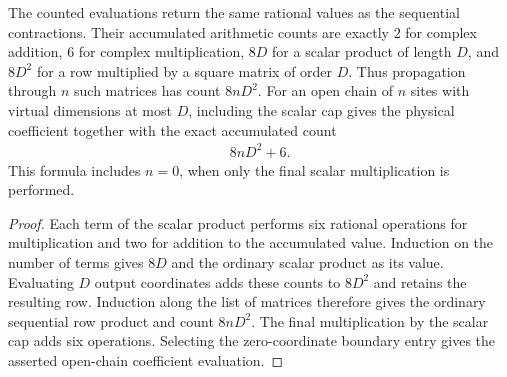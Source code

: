 \begin{lemma}
    \label{lem:lvv_rational_contraction_arithmetic_count}
    \leanok
    The counted evaluations return the same rational values as the
    sequential contractions. Their accumulated arithmetic counts are
    exactly $2$ for complex addition, $6$ for complex multiplication,
    $8D$ for a scalar product of length $D$, and $8D^2$ for a row
    multiplied by a square matrix of order $D$.
    Thus propagation through $n$ such matrices has count $8nD^2$.
    For an open chain of $n$ sites with virtual dimensions at most $D$,
    including the scalar cap gives the physical coefficient together
    with the exact accumulated count
    \begin{align*}
        8nD^2+6.
    \end{align*}
    This formula includes $n=0$, when only the final scalar
    multiplication is performed.
\end{lemma}
\begin{proof}\leanok
    Each term of the scalar product performs six rational operations
    for multiplication and two for addition to the accumulated value.
    Induction on the number of terms gives $8D$ and the ordinary scalar
    product as its value. Evaluating $D$ output coordinates adds these
    counts to $8D^2$ and retains the resulting row.
    Induction along the list of matrices therefore gives the ordinary
    sequential row product and count $8nD^2$. The final multiplication
    by the scalar cap adds six operations. Selecting the zero-coordinate
    boundary entry gives the asserted open-chain coefficient evaluation.
\end{proof}

